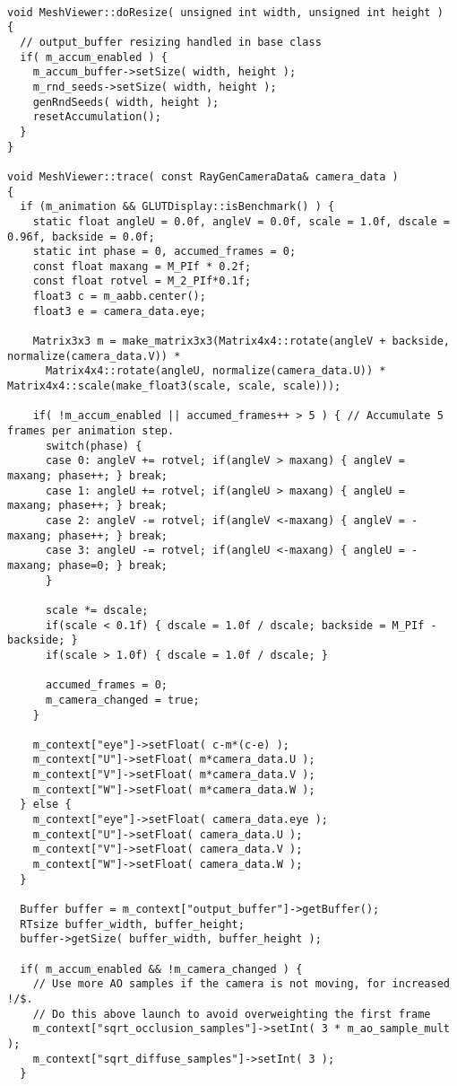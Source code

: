 \begin{verbatim}
          
void MeshViewer::doResize( unsigned int width, unsigned int height )
{
  // output_buffer resizing handled in base class
  if( m_accum_enabled ) {
    m_accum_buffer->setSize( width, height );
    m_rnd_seeds->setSize( width, height );
    genRndSeeds( width, height );
    resetAccumulation();
  }
}

void MeshViewer::trace( const RayGenCameraData& camera_data )
{
  if (m_animation && GLUTDisplay::isBenchmark() ) {
    static float angleU = 0.0f, angleV = 0.0f, scale = 1.0f, dscale = 0.96f, backside = 0.0f;
    static int phase = 0, accumed_frames = 0;
    const float maxang = M_PIf * 0.2f;
    const float rotvel = M_2_PIf*0.1f;
    float3 c = m_aabb.center();
    float3 e = camera_data.eye;

    Matrix3x3 m = make_matrix3x3(Matrix4x4::rotate(angleV + backside, normalize(camera_data.V)) * 
      Matrix4x4::rotate(angleU, normalize(camera_data.U)) * Matrix4x4::scale(make_float3(scale, scale, scale)));

    if( !m_accum_enabled || accumed_frames++ > 5 ) { // Accumulate 5 frames per animation step.
      switch(phase) {
      case 0: angleV += rotvel; if(angleV > maxang) { angleV =  maxang; phase++; } break;
      case 1: angleU += rotvel; if(angleU > maxang) { angleU =  maxang; phase++; } break;
      case 2: angleV -= rotvel; if(angleV <-maxang) { angleV = -maxang; phase++; } break;
      case 3: angleU -= rotvel; if(angleU <-maxang) { angleU = -maxang; phase=0; } break;
      }

      scale *= dscale;
      if(scale < 0.1f) { dscale = 1.0f / dscale; backside = M_PIf - backside; }
      if(scale > 1.0f) { dscale = 1.0f / dscale; }

      accumed_frames = 0;
      m_camera_changed = true;
    }

    m_context["eye"]->setFloat( c-m*(c-e) );
    m_context["U"]->setFloat( m*camera_data.U );
    m_context["V"]->setFloat( m*camera_data.V );
    m_context["W"]->setFloat( m*camera_data.W );
  } else {
    m_context["eye"]->setFloat( camera_data.eye );
    m_context["U"]->setFloat( camera_data.U );
    m_context["V"]->setFloat( camera_data.V );
    m_context["W"]->setFloat( camera_data.W );
  }

  Buffer buffer = m_context["output_buffer"]->getBuffer();
  RTsize buffer_width, buffer_height;
  buffer->getSize( buffer_width, buffer_height );

  if( m_accum_enabled && !m_camera_changed ) {
    // Use more AO samples if the camera is not moving, for increased !/$.
    // Do this above launch to avoid overweighting the first frame
    m_context["sqrt_occlusion_samples"]->setInt( 3 * m_ao_sample_mult );
    m_context["sqrt_diffuse_samples"]->setInt( 3 );
  }


\end{verbatim}
